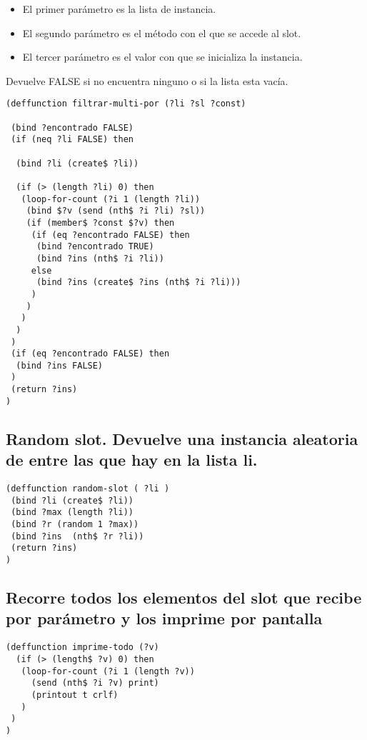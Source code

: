 \documentclass[11pt,svgnames]{scrbook}
\begin{document}
\begin{itemize}
 \item El primer parámetro es la lista de instancia.
\item  El segundo parámetro es el método con el que se accede al slot.
\item  El tercer parámetro es el valor con que se inicializa la instancia.
\end{itemize}

Devuelve FALSE si no encuentra ninguno o si la lista esta vacía.


\begin{verbatim}
(deffunction filtrar-multi-por (?li ?sl ?const)

 (bind ?encontrado FALSE)
 (if (neq ?li FALSE) then

  (bind ?li (create$ ?li))

  (if (> (length ?li) 0) then
   (loop-for-count (?i 1 (length ?li))
    (bind $?v (send (nth$ ?i ?li) ?sl))
    (if (member$ ?const $?v) then
     (if (eq ?encontrado FALSE) then
      (bind ?encontrado TRUE)
      (bind ?ins (nth$ ?i ?li))
     else
      (bind ?ins (create$ ?ins (nth$ ?i ?li)))
     )
    )
   )
  )
 )
 (if (eq ?encontrado FALSE) then
  (bind ?ins FALSE)
 )
 (return ?ins)
)
\end{verbatim}

\subsection{Random slot. Devuelve una instancia aleatoria de entre las que hay en la lista li.}

\begin{verbatim}
(deffunction random-slot ( ?li )
 (bind ?li (create$ ?li))
 (bind ?max (length ?li))
 (bind ?r (random 1 ?max))
 (bind ?ins  (nth$ ?r ?li))
 (return ?ins)
)
\end{verbatim}

\subsection{Recorre todos los elementos del slot que recibe por parámetro y los imprime por pantalla}



\begin{verbatim}
(deffunction imprime-todo (?v)
  (if (> (length$ ?v) 0) then
   (loop-for-count (?i 1 (length ?v))
     (send (nth$ ?i ?v) print)
     (printout t crlf)
   )
 )
)\end{verbatim}
\end{document}
